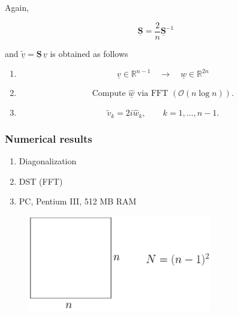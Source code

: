 \documentclass[11pt]{article}
\begin{document}
Again,

\begin{equation*}
  \underline{\mathbf{S}} = \frac{2}{n} \underline{\mathbf{S}}^{-1}
\end{equation*}

and $\underline{\widetilde{v}} = \underline{\mathbf{S}} \, \underline{v}$ is obtained as follows

\renewcommand{\theenumi}{\roman{enumi}}
\renewcommand{\labelenumi}{\textbf{\theenumi)}}

\begin{enumerate}
  \item
    \begin{equation*}
      \underline{v} \in \mathbb{R}^{n-1} \quad \rightarrow \quad \underline{w} \in \mathbb{R}^{2n} 
    \end{equation*}

  \item
    \begin{equation*}
      \text{Compute } \underline{\hat{w}} \text{ via FFT } (\mathcal{O}(n \log n)).
    \end{equation*}
  \item
    \begin{equation*}
      \widetilde{v}_k = 2i \hat{w}_k, \qquad k=1,\ldots,n-1.
    \end{equation*}

\end{enumerate}

\newpage
\subsubsection{Numerical results}

\renewcommand{\theenumi}{$\bullet$}
\renewcommand{\labelenumi}{\theenumi}
\begin{enumerate}
  \item
    Diagonalization

  \item
    DST (FFT)

  \item
    PC, Pentium III, 512 MB RAM

 \end{enumerate}
   
\begin{figure}[h]
  \centering
  \includegraphics[width=8cm]{Domain2D_ntimesn}
\end{figure}
\end{document}
